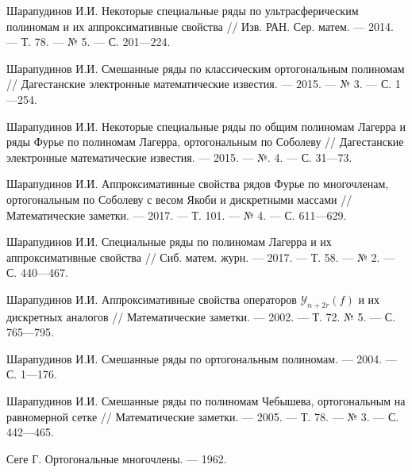 \begin{thebibliography}{99}
Шарапудинов И.И. Некоторые специальные ряды по ультрасферическим полиномам и их аппроксимативные свойства // Изв. РАН. Сер. матем. --- 2014. --- Т. 78. --- № 5. --- С. 201---224.






Шарапудинов И.И. Смешанные ряды по классическим ортогональным полиномам // Дагестанские электронные математические известия. --- 2015. --- № 3. --- С. 1---254.






Шарапудинов И.И. Некоторые специальные ряды по общим полиномам Лагерра и ряды Фурье по полиномам Лагерра, ортогональным по Соболеву // Дагестанские электронные математические известия. --- 2015. --- №. 4. --- С. 31---73.






Шарапудинов И.И. Аппроксимативные свойства рядов Фурье по многочленам, ортогональным по Соболеву с весом Якоби и дискретными массами // Математические заметки. --- 2017. --- Т. 101. --- № 4. --- С. 611---629.






Шарапудинов И.И. Специальные ряды по полиномам Лагерра и их аппроксимативные свойства // Сиб. матем. журн. --- 2017. --- Т. 58. --- № 2. --- С. 440---467.






Шарапудинов И.И. Аппроксимативные свойства операторов $\mathcal{Y}_{n+2r}(f)$ и их дискретных аналогов // Математические заметки. --- 2002. --- Т. 72. № 5. --- С. 765---795.






Шарапудинов И.И. Смешанные ряды по ортогональным полиномам. --- 2004. --- С. 1---176.






Шарапудинов И.И. Смешанные ряды по полиномам Чебышева, ортогональным на равномерной сетке // Математические заметки. --- 2005. --- Т. 78. --- № 3. --- С. 442---465.





Сеге Г. Ортогональные многочлены. --- 1962.







\end{thebibliography}

